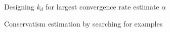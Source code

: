 \documentclass{beamer}
\begin{document}
\begin{frame}{Designing $k_d$ for largest convergence rate estimate $\alpha$}
	\begin{figure}[h!]
		\centering
		
		\label{fig:quadrotor_optimal_kd_ZF_noisy}
	\end{figure}
\end{frame}
\begin{frame}{Conservatism estimation by searching for examples}
	\begin{figure}[h!]
		\centering
		
		\label{fig:quadrotor_optimal_kd_ZF_noisy_conservatism}
	\end{figure}
\end{frame}
\end{document}
